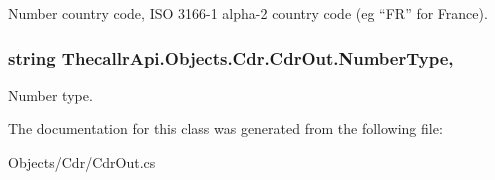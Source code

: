 Number country code, I\+S\+O 3166-\/1 alpha-\/2 country code (eg “\+F\+R” for France). 

\hypertarget{class_thecallr_api_1_1_objects_1_1_cdr_1_1_cdr_out_ad352c614bc31cdfb578bf3de4447fa6e}{
\subsubsection[{Number\+Type}]{\setlength{\rightskip}{0pt plus 5cm}string Thecallr\+Api.\+Objects.\+Cdr.\+Cdr\+Out.\+Number\+Type\hspace{0.3cm}{\ttfamily [get]}, {\ttfamily [set]}}}\label{class_thecallr_api_1_1_objects_1_1_cdr_1_1_cdr_out_ad352c614bc31cdfb578bf3de4447fa6e}


Number type. 



The documentation for this class was generated from the following file\+:\begin{DoxyCompactItemize}
\item 
Objects/\+Cdr/Cdr\+Out.\+cs\end{DoxyCompactItemize}
